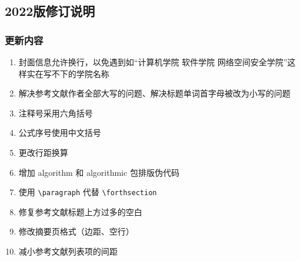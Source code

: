 \subsection*{2022版修订说明}

\subsubsection*{更新内容}

\begin{enumerate}[1、]
    \item 封面信息允许换行，以免遇到如“计算机学院 软件学院 网络空间安全学院”这样实在写不下的学院名称
    \item 解决参考文献作者全部大写的问题、解决标题单词首字母被改为小写的问题
    \item 注释号采用六角括号
    \item 公式序号使用中文括号
    \item 更改行距换算
    \item 增加 algorithm 和 algorithmic 包排版伪代码
    \item 使用 \verb|\paragraph| 代替 \verb|\forthsection|
    \item 修复参考文献标题上方过多的空白
    \item 修改摘要页格式（边距、空行）
    \item 减小参考文献列表项的间距
\end{enumerate}
